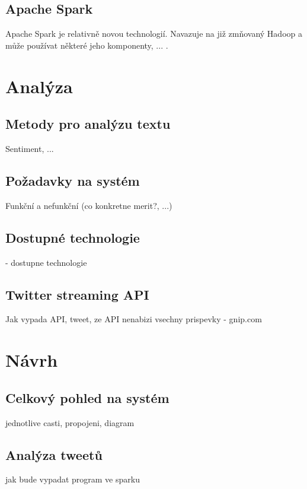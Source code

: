 \documentclass[thesis=B,czech]{FITthesis}[2012/06/26]
\begin{document}
\section{Apache Spark}
	Apache Spark je relativně novou technologií. Navazuje na již zmňovaný Hadoop a může používat některé jeho komponenty, ... . 





\chapter{Analýza}
\section{Metody pro analýzu textu}
	Sentiment, ...

\section{Požadavky na systém}
	Funkční a nefunkční (co konkretne merit?, ...)

\section{Dostupné technologie}
	- dostupne technologie

\section{Twitter streaming API}
	Jak vypada API, tweet, ze API nenabizi vsechny prispevky - gnip.com

\chapter{Návrh}
\section{Celkový pohled na systém}
	jednotlive casti, propojeni, diagram 
\section{Analýza tweetů}
	jak bude vypadat program ve sparku
\end{document}

